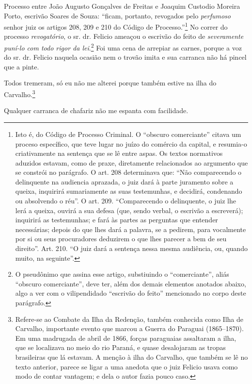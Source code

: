 {Processo entre João Augusto Gonçalves de Freitas e Joaquim Custodio
Moreira Porto, escrivão Soares de Souza: ``ficam, portanto, revogados
pelo \emph{perfumoso} senhor juiz os artigos 208, 209 e 210 do Código de
Processo.''\footnote{ Isto é, do Código de Processo Criminal. O ``obscuro
  comerciante'' citava um proceso específico, que teve lugar no juízo do
  comércio da capital, e resumia-o criativamente na sentença que se lê
  entre aspas. Os textos normativos aduzidos estavam, como de praxe,
  diretamente relacionados ao argumento que se constrói no parágrafo. O
  art. 208 determinava que: ``Não comparecendo o delinquente na audiencia
  aprazada, o juiz dará à parte juramento sobre a queixa, inquirirá
  sumariamente as suas testemunhas, e decidirá, condenando ou absolvendo
  o réu''. O art. 209. ``Comparecendo o delinquente, o juiz lhe lerá a
  queixa, ouvirá a sua defesa (que, sendo verbal, o escrivão a
  escreverá); inquirirá as testemunhas; e fará às partes as perguntas
  que entender necessárias; depois do que lhes dará a palavra, se a
  pedirem, para vocalmente por si ou seus procuradores deduzirem o que
  lhes parecer a bem de seu direito''. Art. 210. ``O juiz dará a sentença
  nessa mesma audiência, ou, quando muito, na seguinte''.} No correr do
processo \emph{revogatório}, o sr. dr. Felicio ameaçou o escrivão do
feito de \emph{severamente puní-lo com todo rigor da lei}.\footnote{ O
  pseudônimo que assina esse artigo, substiuindo o ``comerciante'', aliás
  ``obscuro comerciante'', deve ter, além dos demais elementos anotados
  abaixo, algo a ver com o vilipendidado ``escrivão do feito'' mencionado
  no corpo deste parágrafo.} Foi uma cena de arrepiar as carnes, porque
a voz do sr. dr. Felicio naquela ocasião nem o trovão imita e sua
carranca não há pincel que a pinte.

Todos tremeram, só eu não me alterei porque também estive na ilha do
Carvalho.\footnote{ Refere-se ao Combate da Ilha da Redenção, também
  conhecida como Ilha de Carvalho, importante evento que marcou a Guerra
  do Paraguai (1865--1870). Em uma madrugada de abril de 1866, forças
  paraguaias assaltaram a ilha, que se localizava no meio do rio Paraná,
  e quase desalojaram as tropas brasileiras que lá estavam. A menção à
  ilha do Carvalho, que também se lê no texto anterior, parece se ligar
  a uma anedota que o juiz Felicio usava como modo de contar vantagem; e
  dela o autor fazia pouco caso.}


Qualquer carranca de chafariz não me espanta com facilidade.

\asterisc{}

}
